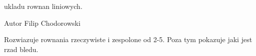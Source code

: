 ukladu rownan liniowych.

\begin{DoxyAuthor}{Autor}
Filip Chodorowski
\end{DoxyAuthor}
Rozwiazuje rownania rzeczywiste i zespolone od 2-\/5. Poza tym pokazuje jaki jest rzad bledu. 